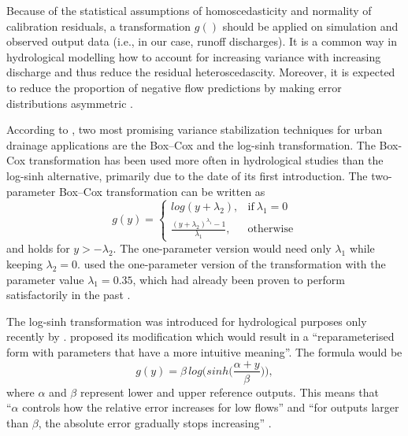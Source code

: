 \documentclass{ctuthesis}\usepackage[]{graphicx}\usepackage[]{color}
\begin{document}
Because of the  statistical assumptions of homoscedasticity and normality of calibration residuals, a transformation $g()$ should be applied on simulation and observed output data (i.e., in our case, runoff discharges).  It is a common way in hydrological modelling how to account for increasing variance with increasing discharge and thus reduce the residual heteroscedascity. Moreover, it is expected to reduce the proportion of negative flow predictions by making error distributions asymmetric \citep{giudice2013improving}.

According to \cite{giudice2013improving},  two most promising variance stabilization techniques for urban drainage
applications are the Box–Cox \citep{box1964analysis}  and the log-sinh \citep{wang2012log} transformation. The Box-Cox transformation has been used more often in hydrological studies  than the log-sinh alternative, primarily due to the date of its first introduction. The two-parameter Box–Cox transformation can be written as
\begin{equation}
 g(y)=
    \begin{cases}
      log(y+\lambda_2) , & \text{if}\ \lambda_1=0 \\
      \frac{(y+\lambda_2)^{\lambda_1}-1}{\lambda_1} , & \text{otherwise}
    \end{cases}
\end{equation}
and holds for $y > -\lambda_2$. The one-parameter version would need only  $\lambda_1$  while keeping $\lambda_2 = 0$. \cite{giudice2013improving} used the one-parameter version of the transformation with the parameter value $\lambda_1=0.35$, which had already been proven to perform satisfactorily in the past \citep[e.g.][]{honti2013integrated, wang2012log}.

The log-sinh transformation was introduced for hydrological purposes only recently by \cite{wang2012log}. \cite{giudice2013improving}  proposed its modification which would result in a \enquote{reparameterised form with parameters that have a more intuitive meaning}. The formula would be
\begin{equation}
g(y)= \beta \, log \Big(sinh \big( \frac{\alpha+y}{\beta} \big) \Big),
\end{equation}
where $\alpha$ and $\beta$ represent lower and upper reference outputs. This means that \\ \enquote{$\alpha$ controls how the relative error increases for low flows} and \enquote{for outputs larger than $\beta$, the absolute error gradually stops increasing} \citep{giudice2013improving}.
\end{document}
